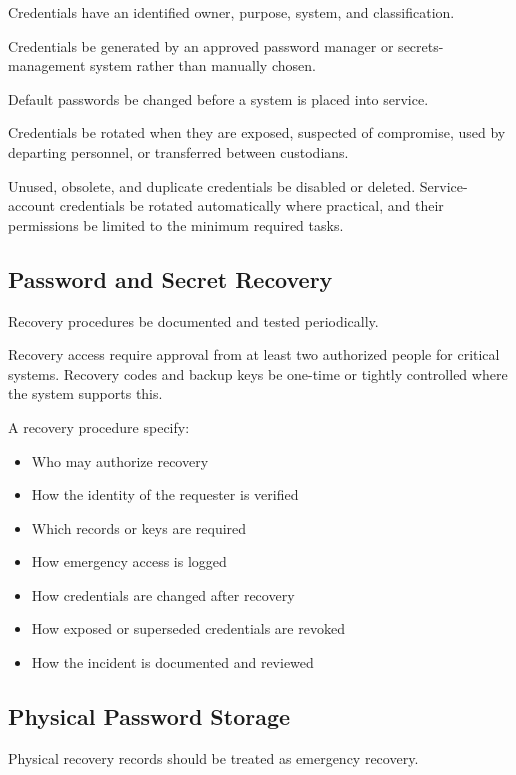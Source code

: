 Credentials \must{} have an identified owner, purpose, system, and classification.

Credentials \should{} be generated by an approved password manager or secrets-management system rather than manually chosen.

Default passwords \must{} be changed before a system is placed into service.

Credentials \must{} be rotated when they are exposed, suspected of compromise, used by departing personnel, or transferred between custodians.

Unused, obsolete, and duplicate credentials \must{} be disabled or deleted. Service-account credentials \should{} be rotated automatically where practical, and their permissions \should{} be limited to the minimum required tasks.

\subsection{Password and Secret Recovery}

Recovery procedures \must{} be documented and tested periodically.

Recovery access \should{} require approval from at least two authorized people for critical systems. Recovery codes and backup keys \should{} be one-time or tightly controlled where the system supports this.

A recovery procedure \should{} specify:

\begin{itemize}
    \item Who may authorize recovery
    \item How the identity of the requester is verified
    \item Which records or keys are required
    \item How emergency access is logged
    \item How credentials are changed after recovery
    \item How exposed or superseded credentials are revoked
    \item How the incident is documented and reviewed
\end{itemize}

\subsection{Physical Password Storage}

Physical recovery records should be treated as emergency recovery.


